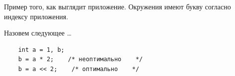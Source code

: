 Пример того, как выглядит приложение. Окружения имеют букву согласно индексу приложения.
\begin{defin}
    Назовем следующее \dots
\end{defin}
\begin{lstlisting}
    int a = 1, b;
    b = a * 2;    /* неоптимально    */
    b = a << 2;    /* оптимально    */
\end{lstlisting}